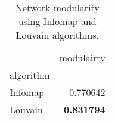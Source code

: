 \begin{table}[!htbp]
\centering
\caption{Network modularity using Infomap and Louvain algorithms.}
\label{tab:modularity}
\begin{tabular}{lr}
\toprule
 & modulairty \\
algorithm &  \\
\midrule
Infomap & 0.770642 \\
Louvain & \textbf{0.831794} \\
\bottomrule
\end{tabular}
\end{table}
